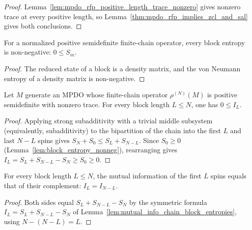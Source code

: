 \begin{proof}\leanok
    Lemma~\ref{lem:mpdo_rfp_positive_length_trace_nonzero} gives nonzero trace
    at every positive length, so
    Lemma~\ref{thm:mpdo_rfp_implies_zcl_and_sal} gives both conclusions.
\end{proof}

\begin{lemma}
    \label{lem:block_entropy_nonneg}
    \leanok
    For a normalized positive semidefinite finite-chain operator, every block entropy
    is non-negative: $0\le S_m$.
\end{lemma}
\begin{proof}\leanok
    The reduced state of a block is a density matrix, and the von Neumann entropy of
    a density matrix is non-negative.
\end{proof}

\begin{lemma}
    \label{lem:mutual_info_chain_nonneg}
    \leanok
    Let $M$ generate an MPDO whose finite-chain operator $\rho^{(N)}(M)$ is positive
    semidefinite with nonzero trace. For every block length $L\le N$, one has
    $0\le I_L$.
\end{lemma}
\begin{proof}\leanok
    Applying strong subadditivity with a trivial middle subsystem (equivalently,
    subadditivity) to the bipartition of the chain into the first $L$ and last
    $N-L$ spins gives $S_N+S_0\le S_L+S_{N-L}$. Since $S_0\ge0$
    (Lemma~\ref{lem:block_entropy_nonneg}), rearranging gives
    $I_L=S_L+S_{N-L}-S_N\ge S_0\ge0$.
\end{proof}

\begin{lemma}
    \label{lem:mutual_info_chain_symm}
    \leanok
    For every block length $L\le N$, the mutual information of the first $L$ spins
    equals that of their complement: $I_L=I_{N-L}$.
\end{lemma}
\begin{proof}\leanok
    Both sides equal $S_L+S_{N-L}-S_N$ by the symmetric formula
    $I_L=S_L+S_{N-L}-S_N$ of
    Lemma~\ref{lem:mutual_info_chain_block_entropies}, using $N-(N-L)=L$.
\end{proof}

